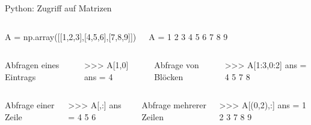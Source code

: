 \documentclass[hyperref={xetex}]{beamer}
\begin{document}
\begin{frame}[fragile]{Python: Zugriff auf Matrizen}
\begin{columns}[c]%
%
\begin{pyin}[basicstyle=\tiny]
A = np.array([[1,2,3],[4,5,6],[7,8,9]])
\end{pyin}%
\begin{pyout}
A =
     1     2     3
     4     5     6
     7     8     9 
\end{pyout}%
\end{columns}%
\begin{columns}[t,onlytextwidth]
Abfragen eines Eintrags
\begin{pyin}
>>> A[1,0]
ans =
     4
\end{pyin}
Abfrage von Blöcken
\begin{pyin}
>>> A[1:3,0:2]
ans =
     4     5     
     7     8     
\end{pyin}
\end{columns}
\begin{columns}[t,onlytextwidth]
Abfrage einer Zeile
\begin{pyin}
>>> A[,:]
ans =
     4     5     6
\end{pyin}
Abfrage mehrerer Zeilen
\begin{pyin}
>>> A[(0,2),:]
ans =
     1     2     3
     7     8     9
\end{pyin}
\end{columns}
\end{frame}

%
%
\end{document}
